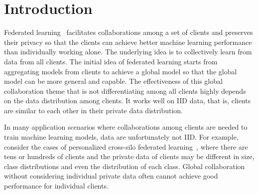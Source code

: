 

\section{Introduction}

Federated learning~\cite{yang2019federated} facilitates collaborations among a set of clients and preserves their privacy so that the clients can achieve better machine learning performance than individually working alone. The underlying idea is to collectively learn from data from all clients. The initial idea of federated learning starts from aggregating models from clients to achieve a global model so that the global model can be more general and capable. The effectiveness of this global collaboration theme that is not differentiating among all clients highly depends on the data distribution among clients.  It works well on IID data, that is, clients are similar to each other in their private data distribution.


In many application scenarios where collaborations among clients are needed to train machine learning models, data are unfortunately not IID.  For example, consider the cases of personalized cross-silo federated learning~\cite{kairouz2019advances}, where there are tens or hundreds of clients and the private data of clients may be different in size, class distributions and even the distribution of each class.  Global collaboration without considering individual private data often cannot achieve good performance for individual clients. 


